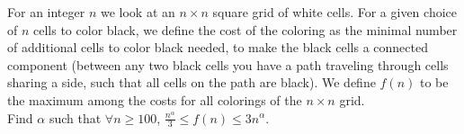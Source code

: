 \begin{problem}
    For an integer \( n \) we look at an \( n \times n \) square grid of white cells. For a given choice of \( n \) cells to color black, we define the cost of the coloring as the minimal number of additional cells to color black needed, to make the black cells a connected component (between any two black cells you have a path traveling through cells sharing a side, such that all cells on the path are black). We define \( f\left(n\right) \) to be the maximum among the costs for all colorings of the \( n \times n \) grid.\\
    Find \( \alpha \) such that \( \forall n \geq 100 \), \( \frac{n^\alpha}{3} \leq f\left(n\right) \leq 3n^\alpha \).
\end{problem}

